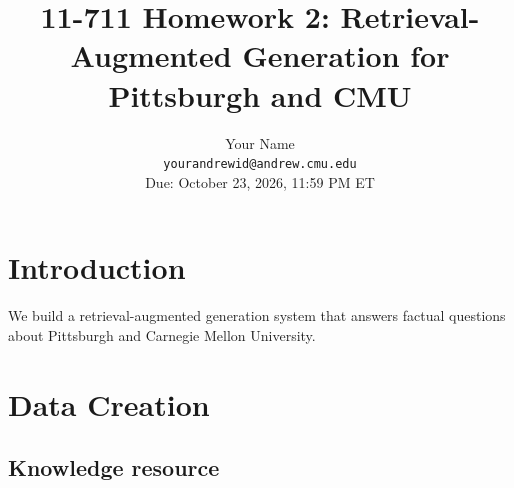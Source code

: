 \documentclass[11pt]{article}
\title{11-711 Homework 2: Retrieval-Augmented Generation for Pittsburgh and CMU}
\author{
  Your Name \\
  \texttt{yourandrewid@andrew.cmu.edu} \\[4pt]
  {\small Due: October 23, 2026, 11:59 PM ET}
}
\begin{document}
\maketitle

\begin{abstract}
\end{abstract}

\section{Introduction}
We build a retrieval-augmented generation system \citep{lewis2021rag} that
answers factual questions about Pittsburgh and Carnegie Mellon University.



\section{Data Creation}
\label{sec:data}

\subsection{Knowledge resource}

\end{document}

